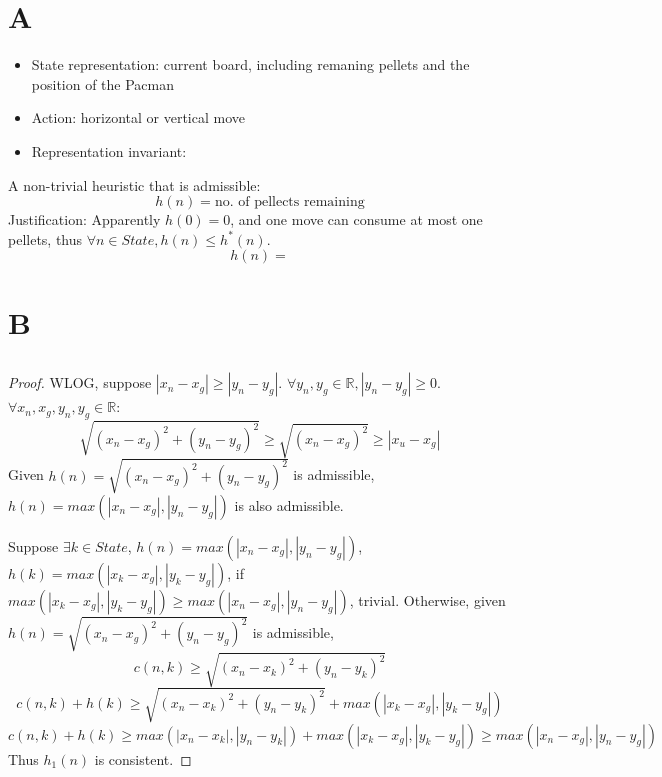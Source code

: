 \documentclass{article}
\begin{document}
\title{}
\author{Wang Xiyu}
\date{}
\maketitle

\section{A} 
\begin{itemize}
    \item State representation: current board, including remaning pellets and the position of the Pacman
    \item Action: horizontal or vertical move 
    \item Representation invariant: 
\end{itemize}
A non-trivial heuristic that is admissible: 
\begin{equation}
    h(n) = \text{no. of pellects remaining}
\end{equation}
Justification: Apparently $h(0) = 0$, and one move can consume at most one pellets, thus $\forall n \in State, h(n) \leq h^*(n)$.
\begin{equation}
    h(n) = 
\end{equation}

\section{B}
\subsection{}
\begin{proof}
    WLOG, suppose $|x_n - x_g| \geq |y_n - y_g|$. $\forall y_n, y_g \in \mathbb{R}, |y_n - y_g| \geq 0$.\newline 
    $\forall x_n, x_g, y_n, y_g \in \mathbb{R}$: 
    \[\sqrt{(x_n - x_g)^2 + (y_n - y_g)^2} \geq \sqrt{(x_n - x_g)^2} \geq |x_u - x_g|\]
    Given $h(n) = \sqrt{(x_n - x_g)^2 + (y_n - y_g)^2}$ is admissible, 
    $h(n) = max(|x_n - x_g|, |y_n - y_g|)$ is also admissible.\newline

    Suppose $\exists k \in State$, $h(n) = max(|x_n - x_g|, |y_n - y_g|)$, 
    $h(k) = max(|x_k - x_g|, |y_k - y_g|)$, if $max(|x_k - x_g|, |y_k - y_g|) \geq max(|x_n - x_g|, |y_n - y_g|)$, trivial.
    Otherwise, given $h(n) = \sqrt{(x_n - x_g)^2 + (y_n - y_g)^2}$ is admissible, 
    \[c(n, k) \geq \sqrt{(x_n - x_k)^2 + (y_n - y_k)^2}\] 
    \[c(n, k) + h(k) \geq \sqrt{(x_n - x_k)^2 + (y_n - y_k)^2} + max(|x_k - x_g|, |y_k - y_g|)\]
    \[c(n, k) + h(k) \geq max(|x_n - x_k|, |y_n - y_k|) + max(|x_k - x_g|, |y_k - y_g|) \geq max(|x_n - x_g|, |y_n - y_g|) \]
    Thus $h_1(n)$ is consistent.

\end{proof}
\end{document}

